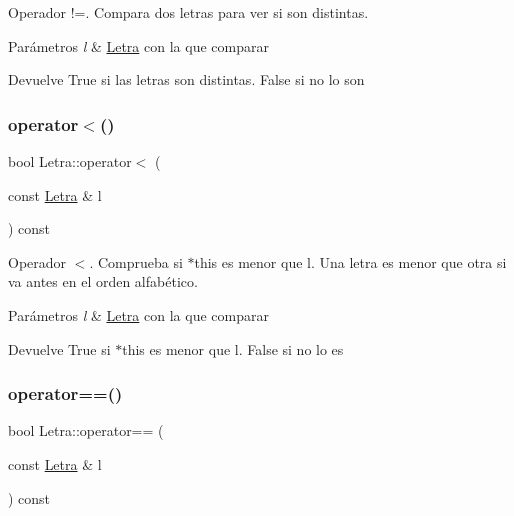 Operador !=. Compara dos letras para ver si son distintas. 


\begin{DoxyParams}{Parámetros}
{\em l} & \hyperlink{classLetra}{Letra} con la que comparar \\
\hline
\end{DoxyParams}
\begin{DoxyReturn}{Devuelve}
True si las letras son distintas. False si no lo son 
\end{DoxyReturn}
\mbox{\label{classLetra_a3f648256284f628aa6fbcf63a2bf68ec}} 
\subsubsection{\texorpdfstring{operator$<$()}{operator<()}}
{\footnotesize\ttfamily bool Letra\+::operator$<$ (\begin{DoxyParamCaption}\item[{const \hyperlink{classLetra}{Letra} \&}]{l }\end{DoxyParamCaption}) const}



Operador $<$. Comprueba si $\ast$this es menor que l. Una letra es menor que otra si va antes en el orden alfabético. 


\begin{DoxyParams}{Parámetros}
{\em l} & \hyperlink{classLetra}{Letra} con la que comparar \\
\hline
\end{DoxyParams}
\begin{DoxyReturn}{Devuelve}
True si $\ast$this es menor que l. False si no lo es 
\end{DoxyReturn}
\mbox{\label{classLetra_a22103d3a6d8b9bd95c95bf5d60909b4a}} 
\subsubsection{\texorpdfstring{operator==()}{operator==()}}
{\footnotesize\ttfamily bool Letra\+::operator== (\begin{DoxyParamCaption}\item[{const \hyperlink{classLetra}{Letra} \&}]{l }\end{DoxyParamCaption}) const}



